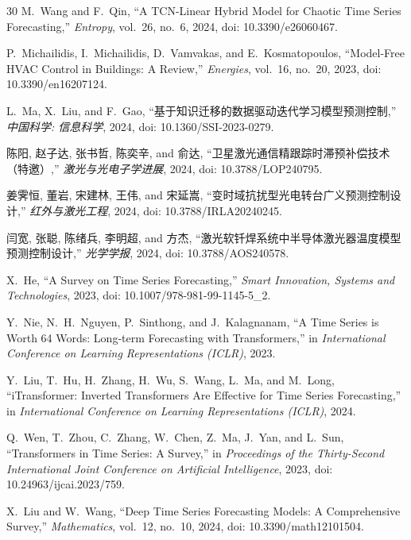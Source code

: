 \documentclass[journal]{IEEEtran}
\begin{document}
\begin{thebibliography}{30}
M.~Wang and F.~Qin, ``A TCN-Linear Hybrid Model for Chaotic Time Series Forecasting,'' \emph{Entropy}, vol.~26, no.~6, 2024, doi: 10.3390/e26060467.

P.~Michailidis, I.~Michailidis, D.~Vamvakas, and E.~Kosmatopoulos, ``Model-Free HVAC Control in Buildings: A Review,'' \emph{Energies}, vol.~16, no.~20, 2023, doi: 10.3390/en16207124.

L.~Ma, X.~Liu, and F.~Gao, ``基于知识迁移的数据驱动迭代学习模型预测控制,'' \emph{中国科学: 信息科学}, 2024, doi: 10.1360/SSI-2023-0279.

陈阳, 赵子达, 张书哲, 陈奕辛, and 俞达, ``卫星激光通信精跟踪时滞预补偿技术（特邀）,'' \emph{激光与光电子学进展}, 2024, doi: 10.3788/LOP240795.

姜霁恒, 董岩, 宋建林, 王伟, and 宋延嵩, ``变时域抗扰型光电转台广义预测控制设计,'' \emph{红外与激光工程}, 2024, doi: 10.3788/IRLA20240245.

闫宽, 张聪, 陈绪兵, 李明超, and 方杰, ``激光软钎焊系统中半导体激光器温度模型预测控制设计,'' \emph{光学学报}, 2024, doi: 10.3788/AOS240578.

X.~He, ``A Survey on Time Series Forecasting,'' \emph{Smart Innovation, Systems and Technologies}, 2023, doi: 10.1007/978-981-99-1145-5\_2.

Y.~Nie, N.~H.~Nguyen, P.~Sinthong, and J.~Kalagnanam, ``A Time Series is Worth 64 Words: Long-term Forecasting with Transformers,'' in \emph{International Conference on Learning Representations (ICLR)}, 2023.

Y.~Liu, T.~Hu, H.~Zhang, H.~Wu, S.~Wang, L.~Ma, and M.~Long, ``iTransformer: Inverted Transformers Are Effective for Time Series Forecasting,'' in \emph{International Conference on Learning Representations (ICLR)}, 2024.

Q.~Wen, T.~Zhou, C.~Zhang, W.~Chen, Z.~Ma, J.~Yan, and L.~Sun, ``Transformers in Time Series: A Survey,'' in \emph{Proceedings of the Thirty-Second International Joint Conference on Artificial Intelligence}, 2023, doi: 10.24963/ijcai.2023/759.

X.~Liu and W.~Wang, ``Deep Time Series Forecasting Models: A Comprehensive Survey,'' \emph{Mathematics}, vol.~12, no.~10, 2024, doi: 10.3390/math12101504.

\end{thebibliography}
\end{document}
